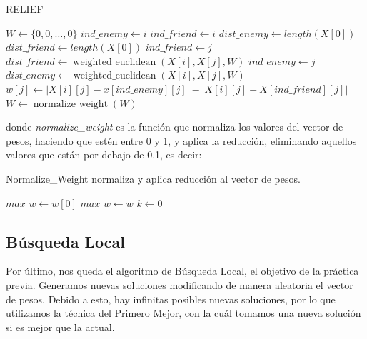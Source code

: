 \documentclass[11pt,a4paper]{article}
\begin{document}
\begin{algorithm}[H]
	\caption{{\sc RELIEF}}
	
	$W \gets \{0, 0, \dots, 0\}$ 
	 {
		$ind\_enemy \gets i$ \;
		$ind\_friend \gets i$ \;
		$dist\_enemy \gets length(X[0])$ 
		$dist\_friend \gets length(X[0])$ 
		 {
			 {
				 {
					$ind\_friend \gets j$ \;
					$dist\_friend \gets \operatorname{weighted\_euclidean}(X[i], X[j], W)$ \;
				}  {
					$ind\_enemy \gets j$ \;
					$dist\_enemy \gets \operatorname{weighted\_euclidean}(X[i], X[j], W)$ \;
				}
			}
		}
		 {
			$w[j] \gets |X[i][j] - x[ind\_enemy][j]| - |X[i][j] - X[ind\_friend][j]|$ \;
		}
	}
	$W \gets \operatorname{normalize\_weight}(W)$ \;
	 \;
\end{algorithm}
donde \emph{normalize\_weight} es la función que normaliza los valores del vector de pesos, haciendo que estén entre 0 y 1, y aplica la reducción, eliminando aquellos valores que están por debajo de 0.1, es decir: \\
\begin{algorithm}[H]
	\caption{{\sc Normalize\_Weight} normaliza y aplica reducción al vector de pesos.}
	
	$max\_w \gets w[0]$ \;
	 {
		 {
			$max\_w \gets w$ \;
		}
	}
	 {
		 {
			$k \gets 0$ \;
		} 
	}
	 \;
\end{algorithm}

\subsection{Búsqueda Local}

Por último, nos queda el algoritmo de Búsqueda Local, el objetivo de la práctica previa. Generamos nuevas soluciones modificando de manera aleatoria el vector de pesos. Debido a esto, hay infinitas posibles nuevas soluciones, por lo que utilizamos la técnica del Primero Mejor, con la cuál tomamos una nueva solución si es mejor que la actual.
\end{document}
